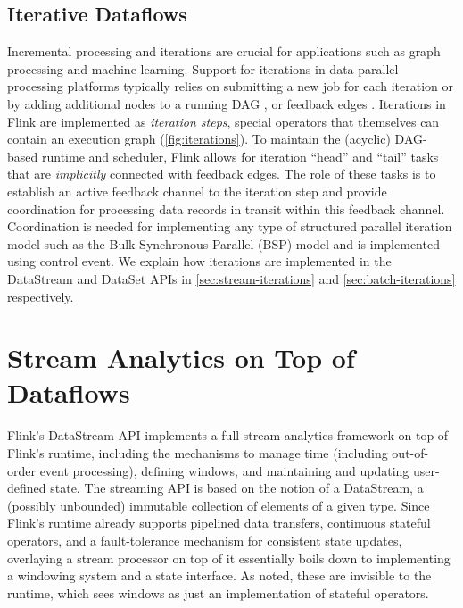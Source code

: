 \documentclass[11pt]{article}
\begin{document}
\subsection{Iterative Dataflows}
\label{sec:iterations}





Incremental processing and iterations are crucial for applications such as graph processing and machine learning. Support for iterations in data-parallel processing platforms typically relies on submitting a new job for each iteration or by adding additional nodes to a running DAG \cite{DBLP:journals/pvldb/BuHBE10, DBLP:conf/hotcloud/ZahariaCFSS10}, or feedback edges \cite{murray2013naiad}. Iterations in Flink are implemented as  \emph{iteration steps}, special operators that themselves can contain an execution graph (\autoref{fig:iterations}). To maintain the (acyclic) DAG-based runtime and scheduler, Flink allows for iteration ``head'' and ``tail'' tasks that are \emph{implicitly} connected with feedback edges. The role of these tasks is to establish an active feedback channel to the iteration step and provide coordination for processing data records in transit within this feedback channel. Coordination is needed for implementing any type of structured parallel iteration model such as the Bulk Synchronous Parallel (BSP) model and is implemented using control event. We explain how iterations are implemented in the DataStream and DataSet APIs in \autoref{sec:stream-iterations} and  \autoref{sec:batch-iterations} respectively. 


\vspace{-4mm}
\section{Stream Analytics on Top of Dataflows}
\label{sec:streaming}

Flink's DataStream API implements a full stream-analytics framework on top of Flink's runtime, including the mechanisms to manage time (including out-of-order event processing), defining windows, and maintaining and updating user-defined state. The streaming API is based on the notion of a DataStream, a (possibly unbounded) immutable collection of elements of a given type. Since Flink's runtime already supports pipelined data transfers, continuous stateful operators, and a fault-tolerance mechanism for consistent state updates, overlaying a stream processor on top of it essentially boils down to implementing a windowing system and a state interface. As noted, these are invisible to the runtime, which sees windows as just an implementation of stateful operators. 
\end{document}
